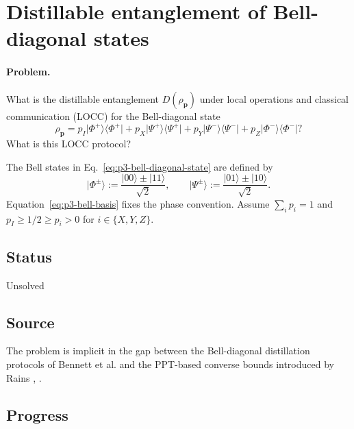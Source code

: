 \section{Distillable entanglement of Bell-diagonal states}
\label{sec:problem-3}

\paragraph{Problem.}
What is the distillable entanglement $D(\rho_{\mathbf p})$ under local
operations and classical communication (LOCC) for the Bell-diagonal state
\begin{equation}
  \rho_{\mathbf p}
  =p_I\lvert\Phi^+\rangle\!\langle\Phi^+\rvert
  +p_X\lvert\Psi^+\rangle\!\langle\Psi^+\rvert
  +p_Y\lvert\Psi^-\rangle\!\langle\Psi^-\rvert
  +p_Z\lvert\Phi^-\rangle\!\langle\Phi^-\rvert?
  \label{eq:p3-bell-diagonal-state}
\end{equation}
What is this LOCC protocol?

The Bell states in Eq.~\eqref{eq:p3-bell-diagonal-state} are defined by
\begin{equation}
  \lvert\Phi^\pm\rangle:=\frac{\lvert00\rangle\pm\lvert11\rangle}{\sqrt2},
  \qquad
  \lvert\Psi^\pm\rangle:=\frac{\lvert01\rangle\pm\lvert10\rangle}{\sqrt2}.
  \label{eq:p3-bell-basis}
\end{equation}
Equation~\eqref{eq:p3-bell-basis} fixes the phase convention.  Assume
$\sum_i p_i=1$ and $p_I\ge1/2\ge p_i>0$ for $i\in\{X,Y,Z\}$.

\subsection*{Status}

Unsolved

\subsection*{Source}

The problem is implicit in the gap between the Bell-diagonal distillation
protocols of Bennett et al. and the PPT-based converse bounds introduced by
Rains ,
.

\subsection*{Progress}

